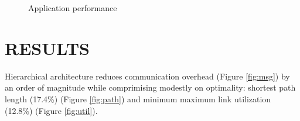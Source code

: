 \documentclass[portrait,a1]{a0poster}
\begin{document}
\begin{multicols}{2}
\begin{figure}[H]
  \begin{center}  
  \end{center}
\caption{Application performance}
\end{figure}

\color{SaddleBrown}
\section*{RESULTS}
\color{DarkSlateGray}
Hierarchical architecture reduces communication overhead (Figure \ref{fig:msg}) by an order of magnitude while comprimising modestly on optimality: shortest path length (17.4\%) (Figure \ref{fig:path}) and minimum maximum link utilization (12.8\%) (Figure \ref{fig:util}).


\end{multicols}
\end{document}
